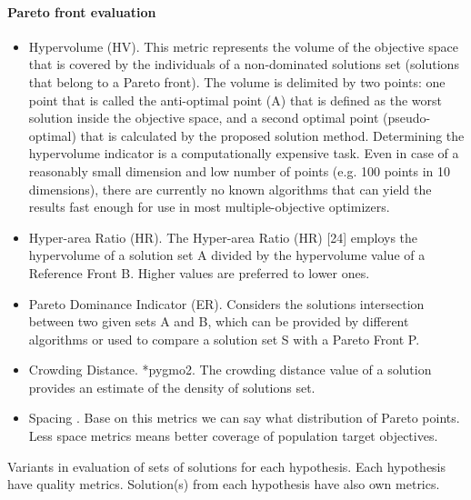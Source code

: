             \paragraph{Pareto front evaluation}
            \begin{itemize}
                \item Hypervolume (HV)\cite{Zitzler2000ComparisonOM}. 
                This metric represents the volume of the objective space
                that is covered by the individuals of a non-dominated
                solutions set (solutions that belong to a Pareto front). The
                volume is delimited by two points: one point that is called
                the anti-optimal point (A) that is defined as the worst
                solution inside the objective space, and a second optimal
                point (pseudo-optimal) that is calculated by the proposed
                solution method.  
                Determining the hypervolume indicator is a computationally expensive task. 
                Even in case of a reasonably small dimension and low number of points (e.g. 100 points in 10 dimensions), 
                there are currently no known algorithms that can yield the results fast enough for use in most multiple-objective optimizers.

                \item Hyper-area Ratio (HR).
                The Hyper-area Ratio (HR) [24] employs the hypervolume of a solution set A
                divided by the hypervolume value of a Reference Front B. Higher values are
                preferred to lower ones.
                \item Pareto Dominance Indicator (ER). 
                Considers the solutions intersection between two given sets A and B, which can be 
                provided by different algorithms or used to compare a solution set S with a Pareto Front P.
                \item Crowding Distance. *pygmo2. The crowding distance value of a solution provides an estimate of the density of solutions set.
                \item Spacing \cite{Schott1995FaultTD}. Base on this metrics we can say what distribution of Pareto points. Less space metrics means better coverage of population target objectives.
                
            \end{itemize}
        
            Variants in evaluation of sets of solutions for each hypothesis.
            Each hypothesis have quality metrics. Solution(s) from each hypothesis have also own metrics.

